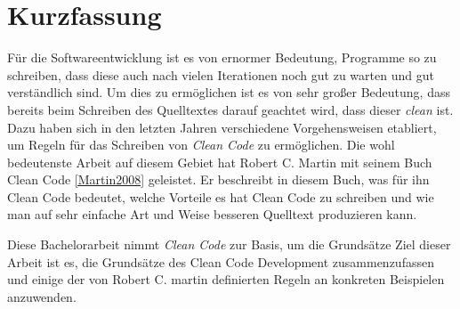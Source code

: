 \chapter{Kurzfassung}

Für die Softwareentwicklung ist es von ernormer Bedeutung, Programme so zu schreiben, dass diese auch nach vielen Iterationen noch gut zu warten und gut verständlich sind. Um dies zu ermöglichen ist es von sehr großer Bedeutung, dass bereits beim Schreiben des Quelltextes darauf geachtet wird, dass dieser \textit{clean} ist. Dazu haben sich in den letzten Jahren verschiedene Vorgehensweisen etabliert, um Regeln für das Schreiben von \textit{Clean Code} zu ermöglichen. Die wohl bedeutenste Arbeit auf diesem Gebiet hat Robert C. Martin mit seinem Buch Clean Code \ref{Martin2008} geleistet. Er beschreibt in diesem Buch, was für ihn Clean Code bedeutet, welche Vorteile es hat Clean Code zu schreiben und wie man auf sehr einfache Art und Weise besseren Quelltext produzieren kann. 

Diese Bachelorarbeit nimmt \textit{Clean Code} zur Basis, um die Grundsätze Ziel dieser Arbeit ist es, die Grundsätze des Clean Code Development zusammenzufassen und einige der von Robert C. martin definierten Regeln an konkreten Beispielen anzuwenden.